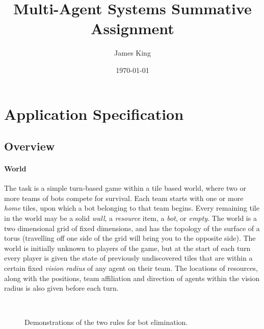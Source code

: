 \documentclass[a4paper,10pt]{article}
\title{Multi-Agent Systems Summative Assignment}
\date{\today}
\author{James King}
\begin{document}
\maketitle

\section{Application Specification}
\subsection{Overview}
\paragraph{World}
The task is a simple turn-based game within a tile based world, where two or more teams of bots compete for survival. Each team starts with one or more \emph{home} tiles, upon which a bot belonging to that team begins. Every remaining tile in the world may be a solid \emph{wall}, a \emph{resource} item, a \emph{bot}, or \emph{empty}. The world is a two dimensional grid of fixed dimensions, and has the topology of the surface of a torus (travelling off one side of the grid will bring you to the opposite side). The world is initially unknown to players of the game, but at the start of each turn every player is given the state of previously undiscovered tiles that are within a certain fixed \emph{vision radius} of any agent on their team. The locations of resources, along with the positions, team affiliation and direction of agents within the vision radius is also given before each turn.

\begin{figure}[ht]
  \centering
  \mbox{
    \quad
  }
  \caption{Demonstrations of the two rules for bot elimination.}
  \vspace{-5mm}
\end{figure}
\end{document}
